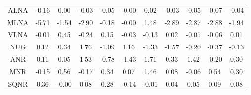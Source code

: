 \begin{longtable}{ | c || c | c | c | c | c | c | c | c | c || c |}
ALNA &  \cellcolor[HTML]{FFFFFF} -0.16 &  \cellcolor[HTML]{FFFFFF} 0.00 &  \cellcolor[HTML]{FFFFFF} -0.03 &  \cellcolor[HTML]{FFFFFF} -0.05 &  \cellcolor[HTML]{FFFFFF} -0.00 &  \cellcolor[HTML]{FFFFFF} 0.02 &  \cellcolor[HTML]{FFFFFF} -0.03 &  \cellcolor[HTML]{FFFFFF} -0.05 &  \cellcolor[HTML]{FFFFFF} -0.07 &  \cellcolor[HTML]{FFFFFF} -0.04 \\
MLNA &  \cellcolor[HTML]{FF7070} -5.71 &  \cellcolor[HTML]{FFD7D7} -1.54 &  \cellcolor[HTML]{FFB7B7} -2.90 &  \cellcolor[HTML]{FFF7F7} -0.18 &  \cellcolor[HTML]{FFFFFF} -0.00 &  \cellcolor[HTML]{D7D7FF} 1.48 &  \cellcolor[HTML]{FFB7B7} -2.89 &  \cellcolor[HTML]{FFB7B7} -2.87 &  \cellcolor[HTML]{FFB7B7} -2.88 &  \cellcolor[HTML]{FFCFCF} -1.94 \\
VLNA &  \cellcolor[HTML]{FFFFFF} -0.01 &  \cellcolor[HTML]{F7F7FF} 0.45 &  \cellcolor[HTML]{FFF7F7} -0.24 &  \cellcolor[HTML]{FFFFFF} 0.15 &  \cellcolor[HTML]{FFFFFF} -0.03 &  \cellcolor[HTML]{FFFFFF} -0.13 &  \cellcolor[HTML]{FFFFFF} 0.02 &  \cellcolor[HTML]{FFFFFF} -0.01 &  \cellcolor[HTML]{FFFFFF} -0.06 &  \cellcolor[HTML]{FFFFFF} 0.01 \\
NUG &  \cellcolor[HTML]{FFFFFF} 0.12 &  \cellcolor[HTML]{F7F7FF} 0.34 &  \cellcolor[HTML]{CFCFFF} 1.76 &  \cellcolor[HTML]{FFE7E7} -1.09 &  \cellcolor[HTML]{DFDFFF} 1.16 &  \cellcolor[HTML]{FFDFDF} -1.33 &  \cellcolor[HTML]{FFD7D7} -1.57 &  \cellcolor[HTML]{FFF7F7} -0.20 &  \cellcolor[HTML]{FFF7F7} -0.37 &  \cellcolor[HTML]{FFFFFF} -0.13 \\
ANR &  \cellcolor[HTML]{FFFFFF} 0.11 &  \cellcolor[HTML]{FFFFFF} 0.05 &  \cellcolor[HTML]{D7D7FF} 1.53 &  \cellcolor[HTML]{FFEFEF} -0.78 &  \cellcolor[HTML]{FFD7D7} -1.43 &  \cellcolor[HTML]{D7D7FF} 1.71 &  \cellcolor[HTML]{F7F7FF} 0.33 &  \cellcolor[HTML]{DFDFFF} 1.42 &  \cellcolor[HTML]{FFF7F7} -0.20 &  \cellcolor[HTML]{F7F7FF} 0.30 \\
MNR &  \cellcolor[HTML]{FFFFFF} -0.15 &  \cellcolor[HTML]{EFEFFF} 0.56 &  \cellcolor[HTML]{FFF7F7} -0.17 &  \cellcolor[HTML]{F7F7FF} 0.34 &  \cellcolor[HTML]{FFFFFF} 0.07 &  \cellcolor[HTML]{D7D7FF} 1.46 &  \cellcolor[HTML]{FFFFFF} 0.08 &  \cellcolor[HTML]{FFFFFF} -0.06 &  \cellcolor[HTML]{EFEFFF} 0.54 &  \cellcolor[HTML]{F7F7FF} 0.30 \\
SQNR &  \cellcolor[HTML]{F7F7FF} 0.36 &  \cellcolor[HTML]{FFFFFF} -0.00 &  \cellcolor[HTML]{FFFFFF} 0.08 &  \cellcolor[HTML]{F7F7FF} 0.28 &  \cellcolor[HTML]{FFFFFF} -0.14 &  \cellcolor[HTML]{FFFFFF} -0.01 &  \cellcolor[HTML]{FFFFFF} 0.04 &  \cellcolor[HTML]{FFFFFF} 0.05 &  \cellcolor[HTML]{FFFFFF} 0.09 &  \cellcolor[HTML]{FFFFFF} 0.08 \\

\end{longtable}
